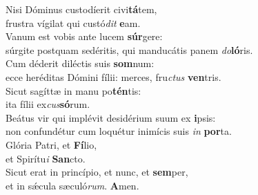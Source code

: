 \evenverse Nisi Dóminus custodíerit civi\textbf{tá}tem,~\*\\
\evenverse frustra vígilat qui custó\textit{dit} \textbf{e}am.\\
\oddverse Vanum est vobis ante lucem \textbf{súr}gere:~\*\\
\oddverse súrgite postquam sedéritis, qui manducátis panem \textit{do}\textbf{ló}ris.\\
\evenverse Cum déderit diléctis suis \textbf{som}num:~\*\\
\evenverse ecce heréditas Dómini fílii: merces, fru\textit{ctus} \textbf{ven}tris.\\
\oddverse Sicut sagíttæ in manu po\textbf{tén}tis:~\*\\
\oddverse ita fílii ex\textit{cus}\textbf{só}rum.\\
\evenverse Beátus vir qui implévit desidérium suum ex \textbf{i}psis:~\*\\
\evenverse non confundétur cum loquétur inimícis suis \textit{in} \textbf{por}ta.\\
\oddverse Glória Patri, et \textbf{Fí}lio,~\*\\
\oddverse et Spirítu\textit{i} \textbf{San}cto.\\
\evenverse Sicut erat in princípio, et nunc, et \textbf{sem}per,~\*\\
\evenverse et in sǽcula sæculó\textit{rum}. \textbf{A}men.\\
